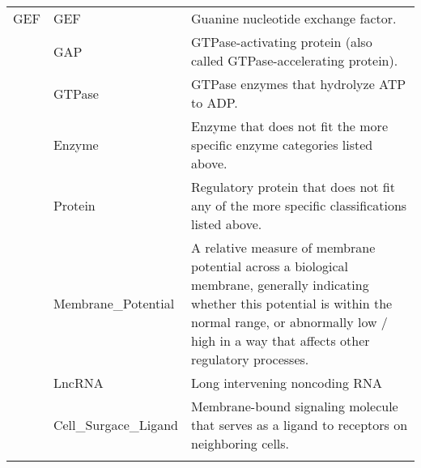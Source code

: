 \documentclass{article}
\begin{document}
\begin{subtables}
\begin{longtable}[c]{@{}llp{}@{}}
{\footnotesize{}GEF}&GEF&Guanine nucleotide exchange factor.\\\addlinespace[\dimexpr0.75\defaultaddspace]
{\footnotesize{}GAP}&GAP&GTPase-activating protein (also called GTPase-accelerating protein).\\\addlinespace[\dimexpr0.75\defaultaddspace]
{\footnotesize{}GTPa}&GTPase&GTPase enzymes that hydrolyze ATP to ADP.\\\addlinespace[\dimexpr0.75\defaultaddspace]
{\footnotesize{}Enz}&Enzyme&Enzyme that does not fit the more specific enzyme categories listed above.\\\addlinespace[\dimexpr0.75\defaultaddspace]
{\footnotesize{}Prot}&Protein&Regulatory protein that does not fit any of the more specific classifications listed above.\\\addlinespace[\dimexpr0.75\defaultaddspace]
{\footnotesize{}MP}&Membrane\_{}Potential&A relative measure of membrane potential across a biological membrane, generally indicating whether this potential is within the  normal range, or abnormally low / high in a way that affects other regulatory processes.\\\addlinespace[\dimexpr0.75\defaultaddspace]
{\footnotesize{}lncRNA}&LncRNA&Long intervening noncoding RNA\\\addlinespace[\dimexpr0.75\defaultaddspace]
{\footnotesize{}SLig}&Cell\_{}Surgace\_{}Ligand&Membrane-bound signaling molecule that serves as a ligand to receptors on neighboring cells.\\
\bottomrule
\end{longtable}


\end{subtables}
\end{document}
